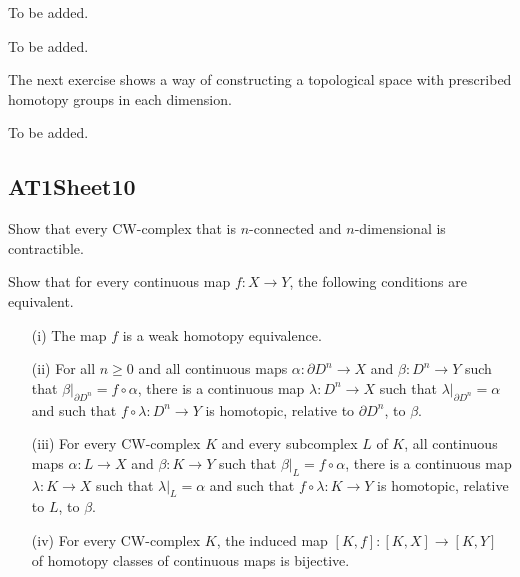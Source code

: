 \label{exercise:AT1Sheet9.1}
To be added.

\begin{sketch}
\end{sketch}

\label{exercise:AT1Sheet9.2}
To be added.

\begin{sketch}
\end{sketch}

The next exercise shows a way of constructing a topological space with prescribed homotopy groups in each dimension.

\label{exercise:AT1Sheet9.3}
To be added.

\begin{sketch}
\end{sketch}

\subsection{AT1Sheet10}

\label{exercise:AT1Sheet10.1}
Show that every CW-complex that is $n$-connected and $n$-dimensional is contractible.

\begin{sketch}
\end{sketch}

\label{exercise:AT1Sheet10.2}
Show that for every continuous map $f : X \to Y$, the following conditions
are equivalent.
\begin{enumerate}
\item[(i)] The map $f$ is a weak homotopy equivalence.
\item[(ii)] For all $n \ge0$ and all continuous maps $\alpha : \partial D^n \to X$ and $\beta : D^n \to Y$ such that
$\left.\beta\right|_{\partial D^n} = f \circ\alpha$, there is a continuous map $\lambda : D^n \to X$ such that $\left.\lambda\right|_{\partial D^n} = \alpha$ and such
that $f\circ \lambda : D^n \to Y$ is homotopic, relative to $\partial D^n$, to $\beta$.
\item[(iii)] For every CW-complex $K$ and every subcomplex $L$ of $K$, all continuous maps $\alpha :
L \to X$ and $\beta : K \to Y$ such that $\left.\beta\right|_L = f\circ\alpha$, there is a continuous map $\lambda : K \to X$
such that $\left.\lambda\right|_L = \alpha$ and such that $f\circ \lambda : K \to Y$ is homotopic, relative to $L$, to $\beta$.
\item[(iv)] For every CW-complex $K$, the induced map
$[K, f]: [K, X] \to [K, Y]$
of homotopy classes of continuous maps is bijective.
\end{enumerate}

